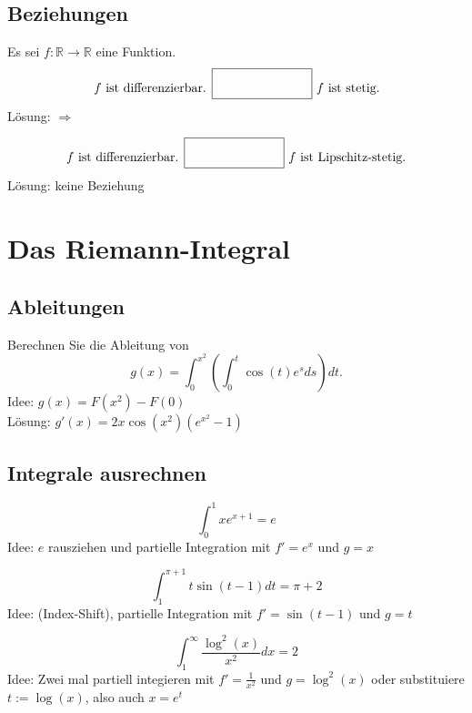 \documentclass[parskip=full]{scrartcl}
\begin{document}
\subsection{Beziehungen}
Es sei $f: \mathbb{R} \to \mathbb{R}$ eine Funktion.
\begin{displaymath}
  f \text{ ist differenzierbar. } \fbox{\rule{1in}{0pt}\rule[-0.5ex]{0pt}{4ex}} \text{ $f$ ist stetig.}
\end{displaymath}
Lösung: $\Rightarrow$

\begin{displaymath}
  f \text{ ist differenzierbar. } \fbox{\rule{1in}{0pt}\rule[-0.5ex]{0pt}{4ex}} \text{ $f$ ist Lipschitz-stetig.}
\end{displaymath}
Lösung: keine Beziehung

\section{Das Riemann-Integral}

\subsection{Ableitungen}
Berechnen Sie die Ableitung von
\begin{displaymath}
  g(x) = \int_{0}^{x^2} \left(\int_{0}^{t} \cos(t)e^s ds\right)dt.
\end{displaymath}
Idee: $g(x) = F(x^2) - F(0)$\\
Lösung: $g'(x) = 2x \cos(x^2) \left(e^{x^2} - 1\right)$

\subsection{Integrale ausrechnen}
\begin{displaymath}
  \int_{0}^{1} xe^{x + 1} = e
\end{displaymath}
Idee: $e$ rausziehen und partielle Integration mit $f' = e^x$ und $g = x$

\begin{displaymath}            
  \int_{1}^{\pi + 1} t\sin(t - 1)dt = \pi + 2                                   
\end{displaymath}
Idee: (Index-Shift), partielle Integration mit $f' = \sin(t - 1)$ und $g = t$

\begin{displaymath}
  \int_{1}^{\infty} \frac{\log^2(x)}{x^2} dx = 2
\end{displaymath}
Idee: Zwei mal partiell integieren mit $f' = \frac{1}{x^2}$ und $g = \log^2(x)$ oder substituiere $t := \log(x)$, also auch $x = e^t$
\end{document}
